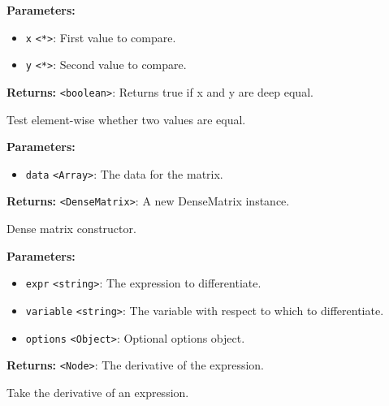 \documentclass[12pt,a4paper]{article}
\begin{document}
\noindent \textbf{Parameters:}
\begin{itemize}
  \item \texttt{x} \texttt{<*>}: First value to compare.
  \item \texttt{y} \texttt{<*>}: Second value to compare.
\end{itemize}

\noindent \textbf{Returns:} \texttt{<boolean>}: Returns true if x and y are deep equal.

\noindent Test element-wise whether two values are equal.

\vspace{5mm}
\noindent {}


\noindent \textbf{Parameters:}
\begin{itemize}
  \item \texttt{data} \texttt{<Array>}: The data for the matrix.
\end{itemize}

\noindent \textbf{Returns:} \texttt{<DenseMatrix>}: A new DenseMatrix instance.

\noindent Dense matrix constructor.

\vspace{5mm}
\noindent {}


\noindent \textbf{Parameters:}
\begin{itemize}
  \item \texttt{expr} \texttt{<string>}: The expression to differentiate.
  \item \texttt{variable} \texttt{<string>}: The variable with respect to which to differentiate.
  \item \texttt{options} \texttt{<Object>}: Optional options object.
\end{itemize}

\noindent \textbf{Returns:} \texttt{<Node>}: The derivative of the expression.

\noindent Take the derivative of an expression.

\vspace{5mm}
\noindent {}\vspace{4mm}
\end{document}
